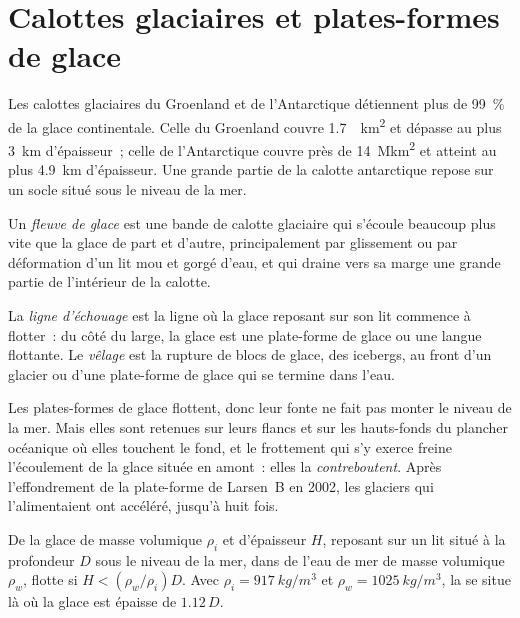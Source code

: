 \section{Calottes glaciaires et plates-formes de glace}\label{sec:b3:glaciology:ice-sheets}

Les calottes glaciaires du Groenland et de l'Antarctique détiennent plus de
\qty{99}{\percent} de la glace continentale. Celle du Groenland couvre \qty{1.7}{\mega
km^2} et dépasse au plus \qty{3}{km} d'épaisseur~; celle de l'Antarctique couvre
près de \qty{14}{\mega km^2} et atteint au plus \qty{4.9}{km} d'épaisseur. Une grande partie
de la calotte antarctique repose sur un socle situé sous le niveau de la mer.

\begin{definition}\label{def:b3:glaciology:ice-stream}
Un \emph{fleuve de glace} est une bande de calotte glaciaire qui
s'écoule beaucoup plus vite que la glace de part et d'autre, principalement par glissement
ou par déformation d'un lit mou et gorgé d'eau, et qui draine vers sa marge une grande
partie de l'intérieur de la calotte.
\end{definition}

\begin{definition}\label{def:b3:glaciology:grounding-line}
La \emph{ligne d'échouage} est la ligne où la glace reposant sur son lit
commence à flotter~: du côté du large, la glace est une plate-forme de glace ou une langue flottante.
Le \emph{vêlage} est la rupture de blocs de glace, des icebergs,
au front d'un glacier ou d'une plate-forme de glace qui se termine
dans l'eau.
\end{definition}

Les plates-formes de glace flottent, donc leur fonte ne fait pas monter le niveau de la mer.
Mais elles sont retenues sur leurs flancs et sur les hauts-fonds du plancher océanique où elles
touchent le fond, et le frottement qui s'y exerce freine l'écoulement de la glace située en
amont~: elles la \emph{contreboutent}. Après l'effondrement de la plate-forme de Larsen~B en 2002,
les glaciers qui l'alimentaient ont accéléré, jusqu'à huit fois.

\begin{proposition}[Flottaison]\label{prop:b3:glaciology:flotation}
De la glace de masse volumique $\rho_i$ et d'épaisseur $H$, reposant sur un lit situé à la
profondeur $D$ sous le niveau de la mer, dans de l'eau de mer de masse volumique $\rho_w$,
flotte si $H < (\rho_w/\rho_i)D$. Avec $\rho_i = \qty{917}{kg/m^3}$ et $\rho_w = \qty{1025}{kg/m^3}$,
la  se situe là où la glace est épaisse de $1.12\,D$.
\end{proposition}

